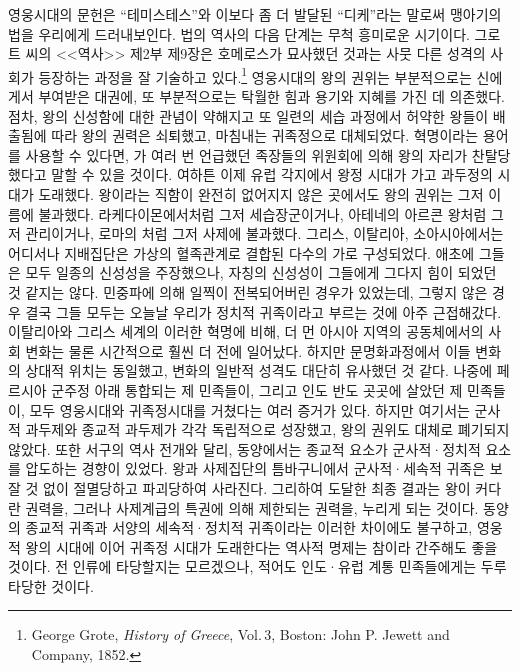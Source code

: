영웅시대의 문헌은 ``테미스테스''와 이보다 좀 더 발달된 ``디케''라는 말로써
맹아기의 법을 우리에게 드러내보인다.
법의 역사의 다음 단계는 무척 흥미로운 시기이다.
그로트 씨의 <<역사>> 제2부 제9장은 호메로스가 묘사했던 것과는
사뭇 다른 성격의 사회가 등장하는 과정을 잘 기술하고 있다.\footnote{%
  \latinmarks
  George Grote,
  \textit{History of Greece},
  Vol.\,3,
  Boston: John P. Jewett and Company,
  1852. }
영웅시대의 왕의 권위는 부분적으로는 신에게서 부여받은 대권에,
또 부분적으로는 탁월한 힘과 용기와 지혜를 가진 데 의존했다.
점차, 왕의 신성함에 대한 관념이 약해지고 또
일련의 세습 과정에서 허약한 왕들이 배출됨에 따라
왕의 권력은 쇠퇴했고, 마침내는 귀족정으로 대체되었다.
혁명이라는 용어를 사용할 수 있다면,
가 여러 번 언급했던 족장들의 위원회에 의해
왕의 자리가 찬탈당했다고 말할 수 있을 것이다.
여하튼 이제 유럽 각지에서 왕정 시대가 가고 과두정의 시대가 도래했다.
왕이라는 직함이 완전히 없어지지 않은 곳에서도 왕의 권위는 그저
이름에 불과했다.
라케다이몬에서처럼 그저 세습장군이거나,
아테네의 아르콘 왕처럼 그저 관리이거나,
로마의 처럼
그저 사제에 불과했다.
그리스, 이탈리아, 소아시아에서는 어디서나
지배집단은 가상의 혈족관계로 결합된 다수의 가로
구성되었다.
애초에 그들은 모두 일종의 신성성을 주장했으나,
자칭의 신성성이 그들에게 그다지 힘이 되었던 것 같지는 않다.
민중파에 의해 일찍이 전복되어버린 경우가 있었는데,
그렇지 않은 경우 결국 그들 모두는
오늘날 우리가 정치적 귀족이라고 부르는 것에 아주 근접해갔다.
이탈리아와 그리스 세계의 이러한 혁명에 비해,
더 먼 아시아 지역의 공동체에서의 사회 변화는
물론 시간적으로 훨씬 더 전에 일어났다.
하지만 문명화과정에서 이들 변화의 상대적 위치는 동일했고,
변화의 일반적 성격도 대단히 유사했던 것 같다.
나중에 페르시아 군주정 아래 통합되는 제 민족들이,
그리고 인도 반도 곳곳에 살았던 제 민족들이,
모두 영웅시대와 귀족정시대를 거쳤다는 여러 증거가 있다.
하지만 여기서는 군사적 과두제와 종교적 과두제가 각각 독립적으로 성장했고,
왕의 권위도 대체로 폐기되지 않았다.
또한 서구의 역사 전개와 달리, 동양에서는
종교적 요소가 군사적^^b7정치적 요소를 압도하는 경향이 있었다.
왕과 사제집단의 틈바구니에서 군사적^^b7세속적 귀족은 보잘 것 없이
절멸당하고 파괴당하여 사라진다.
그리하여 도달한 최종 결과는
왕이 커다란 권력을, 그러나 사제계급의 특권에 의해 제한되는 권력을,
누리게 되는 것이다.
동양의 종교적 귀족과 서양의 세속적^^b7정치적 귀족이라는
이러한 차이에도 불구하고,
영웅적 왕의 시대에 이어 귀족정 시대가 도래한다는 역사적 명제는
참이라 간주해도 좋을 것이다.
전 인류에 타당할지는 모르겠으나, 적어도 인도^^b7유럽 계통 민족들에게는
두루 타당한 것이다.

